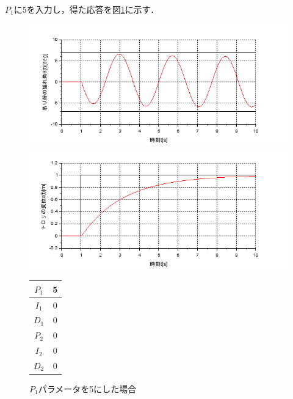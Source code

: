 \documentclass[dvipdfmx,titlepage,a4j]{jsarticle}  %
\begin{document}
$P_1$に5を入力し，得た応答を図\ref{fig:crane:1}に示す．
\begin{figure}[H]
  \begin{minipage}{4.5cm}
    \centering
    \includegraphics[keepaspectratio, scale=0.35]{../graph/crane/ang-P1-5-I1-0-D1-0-P2-0-I2-0-D2-0.png}
  \end{minipage}
  \hfill
  \begin{minipage}{4.5cm}
    \centering
    \includegraphics[keepaspectratio, scale=0.35]{../graph/crane/po-P1-5-I1-0-D1-0-P2-0-I2-0-D2-0.png}
  \end{minipage}
  \hfill
  \begin{minipage}{3cm}
    \begin{center}
      \begin{tabular}{c|c}
        \hline
        $P_1$ & 5 \\ \hline
        $I_1$ & 0 \\ \hline
        $D_1$ & 0 \\ \hline
        $P_2$ & 0 \\ \hline
        $I_2$ & 0 \\ \hline
        $D_2$ & 0 \\
        \hline
      \end{tabular}
    \end{center}
  \end{minipage}
  \hfill
  \caption{$P_1$パラメータを5にした場合}
  \label{fig:crane:1}
\end{figure}
\end{document}
